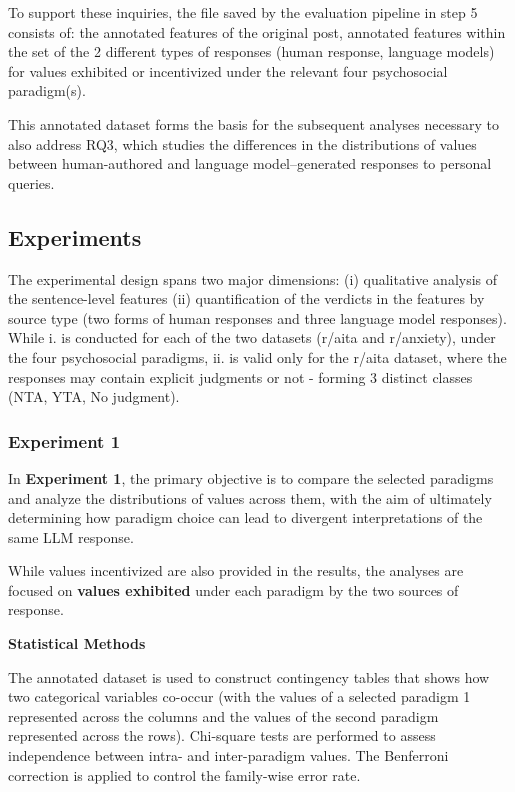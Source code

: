 To support these inquiries, the file saved by the evaluation pipeline in step 5 consists of: the annotated features of the original post, annotated features within the set of the 2 different types of responses (human response, language models) for values exhibited or incentivized under the relevant four psychosocial paradigm(s).

This annotated dataset forms the basis for the subsequent analyses necessary to also address RQ3, which studies the differences in the distributions of values between human-authored and language model–generated responses to personal queries.

\subsection{Experiments}
The experimental design spans two major dimensions: (i) qualitative analysis of the sentence-level features (ii) quantification of the verdicts in the features by source type (two forms of human responses and three language model responses). While i. is conducted for each of the two datasets (r/aita and r/anxiety), under the four psychosocial paradigms, ii. is valid only for the r/aita dataset, where the responses may contain explicit judgments or not - forming 3 distinct classes (NTA, YTA, No judgment).

\subsubsection{Experiment 1}
In \textbf{Experiment 1}, the primary objective is to compare the selected paradigms and analyze the distributions of values across them, with the aim of ultimately determining how paradigm choice can lead to divergent interpretations of the same LLM response.

While values incentivized are also provided in the results, the analyses are focused on \textbf{values exhibited} under each paradigm by the two sources of response.

\smallskip \textbf{Statistical Methods}

The annotated dataset is used to construct contingency tables that shows how two categorical variables co-occur (with the values of a selected paradigm 1 represented across the columns and the values of the second paradigm represented across the rows). Chi-square tests are performed to assess independence between intra- and inter-paradigm values. The Benferroni correction is applied to control the family-wise error rate.

